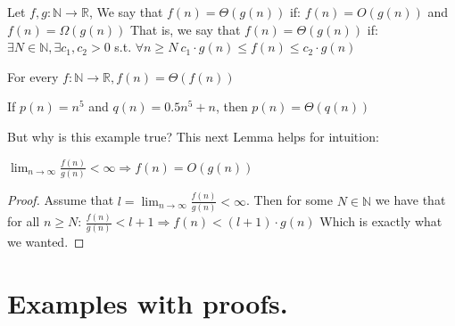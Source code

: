 \begin{figure}[h]
  \label{fig:bigTheta}
\end{figure}


\begin{definition}
Let \( f, g : \mathbb{N} \rightarrow \mathbb{R} \), We say that \(f(n) = \Theta(g(n))\) if:
\(f(n) = O(g(n))\) and \(f(n) = \Omega(g(n))\)
That is, we say that \(f(n) = \Theta(g(n))\) if:
\( \exists N \in \mathbb{N}, \exists c_1, c_2 > 0\) s.t. \(\forall n \ge N \ c_1\cdot g(n) \le f(n) \le c_2 \cdot g(n)\)
\end{definition}
\begin{example} For every \(f : \mathbb{N} \rightarrow \mathbb{R}, f(n) = \Theta(f(n))\) \end{example}
\begin{example} If \(p(n) = n^5\) and \(q(n) = 0.5n^5 + n\), then \(p(n) = \Theta(q(n))\)\end{example}
But why is this example true? This next Lemma helps for intuition:
\begin{lemma}
  \( \lim_{n \rightarrow \infty} \frac{f(n)}{g(n)} < \infty \Rightarrow f(n) = O(g(n)) \)
\end{lemma}

\begin{proof} Assume that \(l = \lim_{n \rightarrow \infty} \frac{f(n)}{g(n)} < \infty\). Then for some \(N \in \mathbb{N}\) we have that for all \(n \ge N\):
\( \frac{f(n)}{g(n)} < l + 1 \Rightarrow f(n) < (l + 1) · g(n) \)
Which is exactly what we wanted.
\end{proof}
\section{Examples with proofs.}

